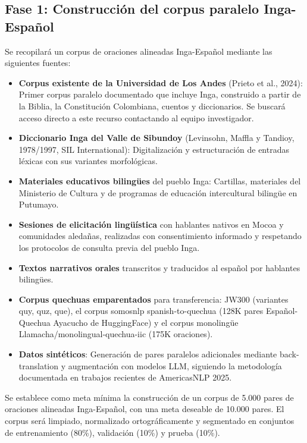 \documentclass[12pt,a4paper]{article}
\begin{document}
\subsection{Fase 1: Construcción del corpus paralelo Inga-Español}

Se recopilará un corpus de oraciones alineadas Inga-Español mediante las siguientes fuentes:

\begin{itemize}
    \item \textbf{Corpus existente de la Universidad de Los Andes} (Prieto et al., 2024): Primer corpus paralelo documentado que incluye Inga, construido a partir de la Biblia, la Constitución Colombiana, cuentos y diccionarios. Se buscará acceso directo a este recurso contactando al equipo investigador.

    \item \textbf{Diccionario Inga del Valle de Sibundoy} (Levinsohn, Maffla y Tandioy, 1978/1997, SIL International): Digitalización y estructuración de entradas léxicas con sus variantes morfológicas.

    \item \textbf{Materiales educativos bilingües} del pueblo Inga: Cartillas, materiales del Ministerio de Cultura y de programas de educación intercultural bilingüe en Putumayo.

    \item \textbf{Sesiones de elicitación lingüística} con hablantes nativos en Mocoa y comunidades aledañas, realizadas con consentimiento informado y respetando los protocolos de consulta previa del pueblo Inga.

    \item \textbf{Textos narrativos orales} transcritos y traducidos al español por hablantes bilingües.

    \item \textbf{Corpus quechuas emparentados} para transferencia: JW300 (variantes quy, quz, que), el corpus somosnlp spanish-to-quechua (128K pares Español-Quechua Ayacucho de HuggingFace) y el corpus monolingüe Llamacha/monolingual-quechua-iic (175K oraciones).

    \item \textbf{Datos sintéticos}: Generación de pares paralelos adicionales mediante back-translation y augmentación con modelos LLM, siguiendo la metodología documentada en trabajos recientes de AmericasNLP 2025.
\end{itemize}

Se establece como meta mínima la construcción de un corpus de 5.000 pares de oraciones alineadas Inga-Español, con una meta deseable de 10.000 pares. El corpus será limpiado, normalizado ortográficamente y segmentado en conjuntos de entrenamiento (80\%), validación (10\%) y prueba (10\%).
\end{document}
